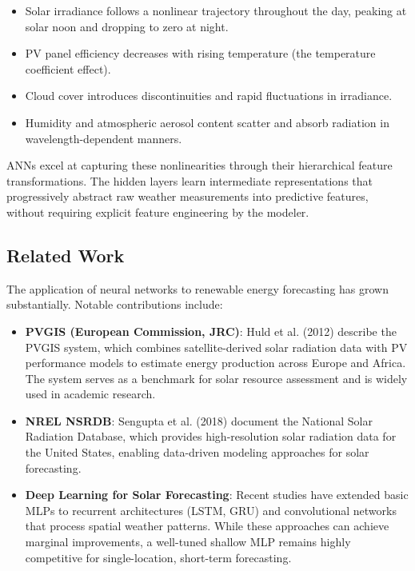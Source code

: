 \documentclass[11pt, a4paper]{article}
\begin{document}
\begin{itemize}
    \item Solar irradiance follows a nonlinear trajectory throughout the day,
    peaking at solar noon and dropping to zero at night.
    \item PV panel efficiency decreases with rising temperature (the
temperature coefficient effect).
    \item Cloud cover introduces discontinuities and rapid fluctuations in
    irradiance.
    \item Humidity and atmospheric aerosol content scatter and absorb radiation
    in wavelength-dependent manners.
\end{itemize}

ANNs excel at capturing these nonlinearities through their hierarchical feature
transformations. The hidden layers learn intermediate representations that
progressively abstract raw weather measurements into predictive features,
without requiring explicit feature engineering by the modeler.

\subsection{Related Work}

The application of neural networks to renewable energy forecasting has grown
substantially. Notable contributions include:

\begin{itemize}
    \item \textbf{PVGIS (European Commission, JRC)}: Huld et al. (2012) describe
the PVGIS system, which combines satellite-derived solar radiation data with
PV performance models to estimate energy production across Europe and Africa.
The system serves as a benchmark for solar resource assessment and is widely
used in academic research.
    \item \textbf{NREL NSRDB}: Sengupta et al. (2018) document the National Solar
Radiation Database, which provides high-resolution solar radiation data for the
United States, enabling data-driven modeling approaches for solar forecasting.
    \item \textbf{Deep Learning for Solar Forecasting}: Recent studies have
extended basic MLPs to recurrent architectures (LSTM, GRU) and convolutional
networks that process spatial weather patterns. While these approaches can
achieve marginal improvements, a well-tuned shallow MLP remains highly
competitive for single-location, short-term forecasting.
\end{itemize}
\end{document}

